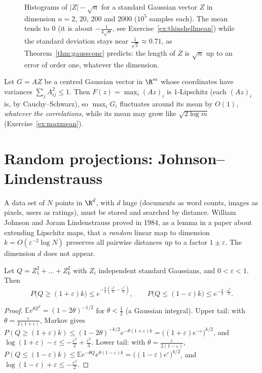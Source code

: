 \begin{figure}[ht]
\centering{}
\caption{Histograms of $|Z|-\sqrt n$ for a standard Gaussian vector $Z$ in dimension $n=2$, $20$, $200$ and $2000$ ($10^5$ samples each). The mean tends to $0$ (it is about
$-\frac1{4\sqrt n}$, see Exercise~\ref{ex:thinshellmean}) while the standard deviation stays near $\frac1{\sqrt2}\approx0.71$, as Theorem~\ref{thm:gaussconc} predicts: the
length of $Z$ is $\sqrt n$ up to an error of order one, whatever the dimension.}
\label{fig:thinshell}
\end{figure}

\begin{example}\label{ex:gaussmax}
Let $G=AZ$ be a centred Gaussian vector in $\R^m$ whose coordinates have variances $\sum_jA_{ij}^2\le1$. Then $F(z)=\max_i(Az)_i$ is $1$-Lipschitz (each $(Az)_i$ is, by
Cauchy--Schwarz), so $\max_iG_i$ fluctuates around its mean by $O(1)$, \emph{whatever the correlations}, while its mean may grow like $\sqrt{2\log m}$
(Exercise~\ref{ex:maxmean}).
\end{example}

\section{Random projections: Johnson--Lindenstrauss}

A data set of $N$ points in $\R^d$, with $d$ huge (documents as word counts, images as pixels, users as ratings), must be stored and searched by distance. William Johnson
and Joram Lindenstrauss proved in 1984, as a lemma in a paper about extending Lipschitz maps, that a \emph{random} linear map to dimension $k=O(\varepsilon^{-2}\log N)$
preserves all pairwise distances up to a factor $1\pm\varepsilon$. The dimension $d$ does not appear.

\begin{lemma}\label{lem:chisq}
Let $Q=Z_1^2+\dots+Z_k^2$ with $Z_i$ independent standard Gaussians, and $0<\varepsilon<1$. Then
\[
P\bigl(Q\ge(1+\varepsilon)k\bigr)\le e^{-\frac k2(\frac{\varepsilon^2}2-\frac{\varepsilon^3}3)},\qquad P\bigl(Q\le(1-\varepsilon)k\bigr)\le e^{-\frac k2\cdot\frac{\varepsilon^2}2}.
\]
\end{lemma}
\begin{proof}
$\mathbb Ee^{\theta Z^2}=(1-2\theta)^{-1/2}$ for $\theta<\frac12$ (a Gaussian integral). Upper tail: with $\theta=\frac\varepsilon{2(1+\varepsilon)}$, Markov gives
$P(Q\ge(1+\varepsilon)k)\le(1-2\theta)^{-k/2}e^{-\theta(1+\varepsilon)k}=\bigl((1+\varepsilon)e^{-\varepsilon}\bigr)^{k/2}$, and $\log(1+\varepsilon)-\varepsilon\le-\frac{\varepsilon^2}2+\frac{\varepsilon^3}3$. Lower tail: with
$\theta=\frac\varepsilon{2(1-\varepsilon)}$, $P(Q\le(1-\varepsilon)k)\le\mathbb Ee^{-\theta Q}e^{\theta(1-\varepsilon)k}=\bigl((1-\varepsilon)e^{\varepsilon}\bigr)^{k/2}$, and $\log(1-\varepsilon)+\varepsilon\le-\frac{\varepsilon^2}2$.
\end{proof}

